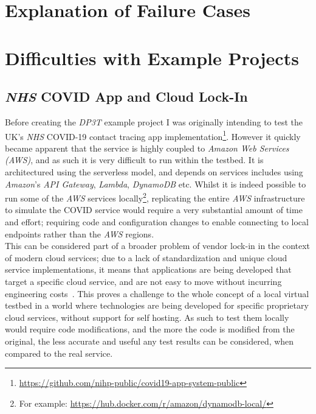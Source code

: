 \documentclass[
    author={Jacob Daniel Halsey},
    supervisor={Prof. Awais Rashid},
    degree={BSc},
    title={Building a Testbed for Evaluating Privacy Enhancing Technologies  (PETs)},
    subtitle={},
    type={software development},
    year={2021}
]{dissertation}
\begin{document}
\section{Explanation of Failure Cases}


\section{Difficulties with Example Projects}

\subsection{\emph{NHS} COVID App and Cloud Lock-In}

Before creating the \emph{DP3T} example project I was originally intending to test the UK's \emph{NHS} COVID-19 
contact tracing app implementation\footnote{\url{https://github.com/nihp-public/covid19-app-system-public}}. 
However it quickly became apparent that the service is highly coupled to
\emph{Amazon Web Services (AWS)}, and as such it is very difficult to run within the testbed.
It is architectured using the serverless model, and depends on services includes using \emph{Amazon}'s 
\emph{API Gateway}, \emph{Lambda}, \emph{DynamoDB} etc.
Whilst it is indeed possible to run some of the \emph{AWS} services 
locally\footnote{For example: \url{https://hub.docker.com/r/amazon/dynamodb-local/}}, replicating
the entire \emph{AWS} infrastructure to simulate the COVID service would require a very substantial amount of 
time and effort; requiring code and configuration changes to enable connecting to local endpoints rather than the
\emph{AWS} regions.\\

This can be considered part of a broader problem of vendor lock-in in the context of modern
cloud services; due to a lack of standardization and unique cloud service implementations, it means
that applications are being developed that target a specific cloud service, and are not easy to move
without incurring engineering costs~\cite{cloud_lock_in}. This proves a challenge to the whole concept 
of a local virtual testbed in a world where technologies are being developed for specific proprietary
cloud services, without support for self hosting. As such to test them locally would require code modifications,
and the more the code is modified from the original, the less accurate and useful any test results can be 
considered, when compared to the real service.
\end{document}
